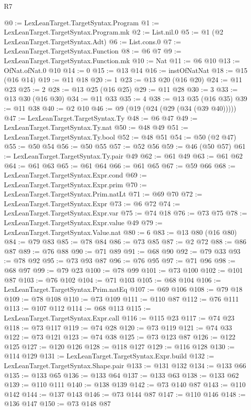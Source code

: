 \begin{lexlean}{R7}
\begin{coremodule}
@0 := LexLeanTarget.TargetSyntax.Program
@1 := LexLeanTarget.TargetSyntax.Program.mk
@2 := List.nil.{0}
@5 := @1 (@2 LexLeanTarget.TargetSyntax.Adt)
@6 := List.cons.{0}
@7 := LexLeanTarget.TargetSyntax.Function
@8 := @6 @7
@9 := LexLeanTarget.TargetSyntax.Function.mk
@10 := Nat
@11 := @6 @10
@13 := OfNat.ofNat.{0} @10
@14 := 0
@15 := @13 @14
@16 := instOfNatNat
@18 := @15 (@16 @14)
@19 := @11 @18
@20 := 1
@23 := @13 @20 (@16 @20)
@24 := @11 @23
@25 := 2
@28 := @13 @25 (@16 @25)
@29 := @11 @28
@30 := 3
@33 := @13 @30 (@16 @30)
@34 := @11 @33
@35 := 4
@38 := @13 @35 (@16 @35)
@39 := @11 @38
@40 := @2 @10
@46 := @9 (@19 (@24 (@29 (@34 (@39 @40)))))
@47 := LexLeanTarget.TargetSyntax.Ty
@48 := @6 @47
@49 := LexLeanTarget.TargetSyntax.Ty.nat
@50 := @48 @49
@51 := LexLeanTarget.TargetSyntax.Ty.bool
@52 := @48 @51
@54 := @50 (@2 @47)
@55 := @50 @54
@56 := @50 @55
@57 := @52 @56
@59 := @46 (@50 @57)
@61 := LexLeanTarget.TargetSyntax.Ty.pair @49
@62 := @61 @49
@63 := @61 @62
@64 := @61 @63
@65 := @61 @64
@66 := @61 @65
@67 := @59 @66
@68 := LexLeanTarget.TargetSyntax.Expr.cond
@69 := LexLeanTarget.TargetSyntax.Expr.prim
@70 := LexLeanTarget.TargetSyntax.Prim.natLt
@71 := @69 @70
@72 := LexLeanTarget.TargetSyntax.Expr
@73 := @6 @72
@74 := LexLeanTarget.TargetSyntax.Expr.var
@75 := @74 @18
@76 := @73 @75
@78 := LexLeanTarget.TargetSyntax.Expr.value @49
@79 := LexLeanTarget.TargetSyntax.Value.nat
@80 := 6
@83 := @13 @80 (@16 @80)
@84 := @79 @83
@85 := @78 @84
@86 := @73 @85
@87 := @2 @72
@88 := @86 @87
@89 := @76 @88
@90 := @71 @89
@91 := @68 @90
@92 := @79 @33
@93 := @78 @92
@95 := @73 @93 @87
@96 := @76 @95
@97 := @71 @96
@98 := @68 @97
@99 := @79 @23
@100 := @78 @99
@101 := @73 @100
@102 := @101 @87
@103 := @76 @102
@104 := @71 @103
@105 := @68 @104
@106 := LexLeanTarget.TargetSyntax.Prim.natEq
@107 := @69 @106
@108 := @79 @18
@109 := @78 @108
@110 := @73 @109
@111 := @110 @87
@112 := @76 @111
@113 := @107 @112
@114 := @68 @113
@115 := LexLeanTarget.TargetSyntax.Expr.call
@116 := @115 @23
@117 := @74 @23
@118 := @73 @117
@119 := @74 @28
@120 := @73 @119
@121 := @74 @33
@122 := @73 @121
@123 := @74 @38
@125 := @73 @123 @87
@126 := @122 @125
@127 := @120 @126
@128 := @118 @127
@129 := @116 @128
@130 := @114 @129
@131 := LexLeanTarget.TargetSyntax.Expr.build
@132 := LexLeanTarget.TargetSyntax.Shape.pair
@133 := @131 @132
@134 := @133 @66
@135 := @133 @65
@136 := @133 @64
@137 := @133 @63
@138 := @133 @62
@139 := @110 @111
@140 := @138 @139
@142 := @73 @140 @87
@143 := @110 @142
@144 := @137 @143
@146 := @73 @144 @87
@147 := @110 @146
@148 := @136 @147
@150 := @73 @148 @87

\end{coremodule}
\end{lexlean}
